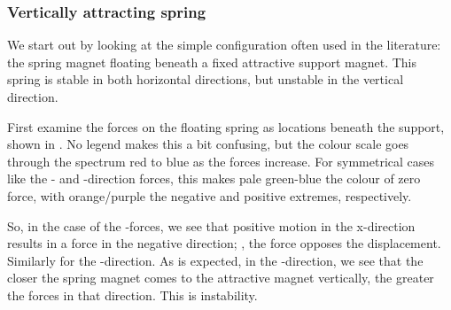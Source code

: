 \documentclass[11pt,a4paper]{memoir}
\begin{document}
\subsubsection{Vertically attracting spring}

We start out by looking at the simple configuration often used in the
literature: the spring magnet floating beneath a fixed attractive support
magnet. This spring is stable in both horizontal directions, but unstable in
the vertical direction.

First examine the forces on the floating spring as locations beneath the
support, shown in . No legend makes this a bit confusing,
but the colour scale goes through the spectrum red to blue as the forces
increase. For symmetrical cases like the \x- and \y-direction forces, this
makes pale green-blue the colour of zero force, with orange/purple the
negative and positive extremes, respectively.

So, in the case of the \x-forces, we see that positive motion in the
x-direction results in a force in the negative direction; \ie, the force
opposes the displacement. Similarly for the \y-direction. As is expected, in
the \z-direction, we see that the closer the spring magnet comes to the
attractive magnet vertically, the greater the forces in that direction. This
is instability.

\newcommand\isoforces[2]{%
  \begin{figure}
    \begin{wide}
      \grf[width=0.3\linewidth]{Simulations/Single_magnets/all_springs/eps_nice/#1-xforce}\hfill
      \grf[width=0.3\linewidth]{Simulations/Single_magnets/all_springs/eps_nice/#1-yforce}\hfill
      \grf[width=0.3\linewidth]{Simulations/Single_magnets/all_springs/eps_nice/#1-zforce}
    \end{wide}
    \caption{#2}
    \figlabel{#1-forces}
  \end{figure}
}
\newcommand\isostiffnesses[2]{%
  \begin{figure}
    \begin{wide}
      \grf[width=0.3\linewidth]{Simulations/Single_magnets/all_springs/eps_nice/#1-xstiffness}\hfill
      \grf[width=0.3\linewidth]{Simulations/Single_magnets/all_springs/eps_nice/#1-ystiffness}\hfill
      \grf[width=0.3\linewidth]{Simulations/Single_magnets/all_springs/eps_nice/#1-zstiffness}
    \end{wide}
    \caption{#2}
    \figlabel{#1-stiffnesses}
  \end{figure}
}
\end{document}
